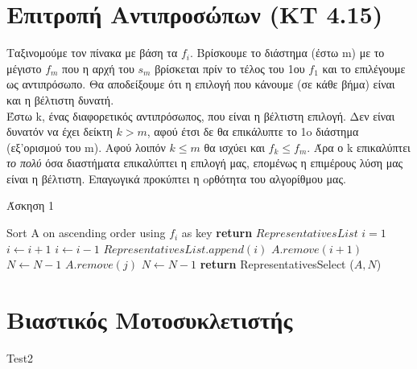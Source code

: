 \documentclass[a4paper,11pt]{article}
\begin{document}
\renewcommand{\labelenumi}{\roman{enumi})}
\renewcommand{\labelenumii}{(\arabic{enumii})}



\section{Επιτροπή Αντιπροσώπων (KT 4.15)} \setcounter{section}{1}
Ταξινομούμε τον πίνακα με βάση τα $f_i$. Βρίσκουμε το διάστημα (έστω m) με το
μέγιστο $f_m$ που η αρχή του $s_m$ βρίσκεται πρίν το τέλος του 1ου $f_1$ και
το επιλέγουμε ως αντιπρόσωπο.
Θα αποδείξουμε ότι η επιλογή που κάνουμε (σε κάθε βήμα) είναι και η βέλτιστη
δυνατή. \\
Έστω k, ένας διαφορετικός αντιπρόσωπος, που είναι η βέλτιστη επιλογή. Δεν
είναι δυνατόν να έχει δείκτη $k > m$, αφού έτσι δε θα επικάλυπτε το 1o διάστημα
(εξ'ορισμού του m). Αφού λοιπόν $k \leq m$ θα ισχύει και $f_k \leq f_m$. Άρα ο
k επικαλύπτει \emph{το πολύ} όσα διαστήματα επικαλύπτει η επιλογή μας,
επομένως η επιμέρους λύση μας είναι η βέλτιστη.
Eπαγωγικά προκύπτει η oρθότητα του αλγορίθμου μας.

\begin{algorithm}[H]
\caption{Άσκηση 1}
\begin{algorithmic}[1]
    \State Sort A on ascending order using $f_i$ as key
    \State \textbf{return} $RepresentativesList$
    \Else
    \State $i = 1$
        \State $i \gets i+1$
    \EndWhile
    \State $i \gets i-1$
    \State $RepresentativesList.append (i)$
	\State $A.remove(i+1)$
	\State $N \gets N-1$
    \EndIf
	\State $A.remove (j)$
	\State $N \gets N-1$
    \EndFor
    \State \textbf{return} RepresentativesSelect ($A, N$)
    \EndIf
\EndProcedure
\end{algorithmic}
\end{algorithm}


\vspace{3cm}

\section{Βιαστικός Μοτοσυκλετιστής}
Test2
\end{document}
